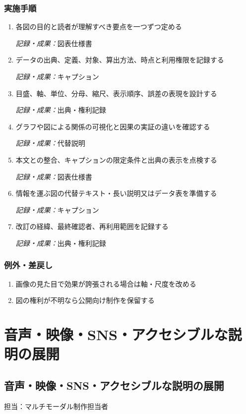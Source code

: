 \documentclass[a4paper,11pt]{article}
\begin{document}
\subsubsection*{実施手順}
\begin{enumerate}[leftmargin=2em,itemsep=0.65em]
\item 各図の目的と読者が理解すべき要点を一つずつ定める\par\noindent\textit{記録・成果：}図表仕様書\nobreak\smallskip
\item データの出典、定義、対象、算出方法、時点と利用権限を記録する\par\noindent\textit{記録・成果：}キャプション\nobreak\smallskip
\item 目盛、軸、単位、分母、縮尺、表示順序、誤差の表現を設計する\par\noindent\textit{記録・成果：}出典・権利記録\nobreak\smallskip
\item グラフや図による関係の可視化と因果の実証の違いを確認する\par\noindent\textit{記録・成果：}代替説明\nobreak\smallskip
\item 本文との整合、キャプションの限定条件と出典の表示を点検する\par\noindent\textit{記録・成果：}図表仕様書\nobreak\smallskip
\item 情報を運ぶ図の代替テキスト・長い説明又はデータ表を準備する\par\noindent\textit{記録・成果：}キャプション\nobreak\smallskip
\item 改訂の経緯、最終確認者、再利用範囲を記録する\par\noindent\textit{記録・成果：}出典・権利記録\nobreak\smallskip
\end{enumerate}
\subsubsection*{例外・差戻し}
\begin{enumerate}[leftmargin=2em,itemsep=0.35em]
\item 画像の見た目で効果が誇張される場合は軸・尺度を改める
\item 図の権利が不明なら公開向け制作を保留する
\end{enumerate}
\section{音声・映像・SNS・アクセシブルな説明の展開}
\subsection{音声・映像・SNS・アクセシブルな説明の展開}
\par 担当：マルチモーダル制作担当者\par\medskip
\end{document}
